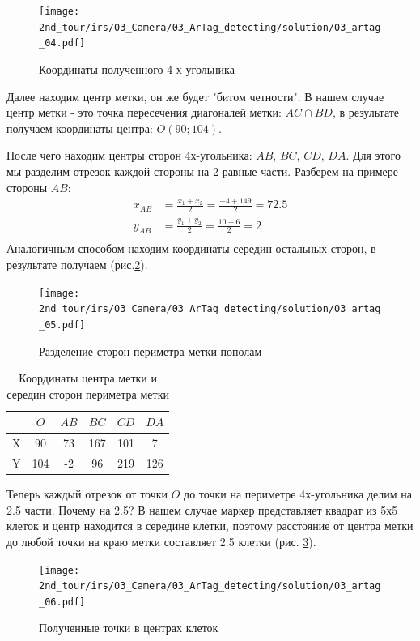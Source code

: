 \begin{figure}[H]
	\centering
	\texttt{[image: 2nd\_tour/irs/03\_Camera/03\_ArTag\_detecting/solution/03\_artag\_04.pdf]}
	\caption{Координаты полученного 4-х угольника}
	\label{fig:03_artag_04}
\end{figure}

Далее находим центр метки, он же будет "битом четности". В нашем случае центр метки - это точка пересечения диагоналей метки: $AC \cap BD$, в результате получаем координаты центра: $O(90; 104)$.

После чего находим центры сторон 4х-угольника: $AB$, $BC$, $CD$, $DA$. Для этого мы разделим отрезок каждой стороны на 2 равные части. Разберем на примере стороны $AB$:
\begin{equation*}
\begin{aligned}
x_{AB} & = \frac{x_1 + x_2}{2} = \frac{-4 + 149}{2} = 72.5 \\
y_{AB} & = \frac{y_1 + y_2}{2} = \frac{10 - 6}{2} = 2 \\		
\end{aligned}
\end{equation*}
Аналогичным способом находим координаты середин остальных сторон, в результате получаем (рис.\ref{fig:03_artag_05}).
\begin{figure}[H]
	\centering
	\texttt{[image: 2nd\_tour/irs/03\_Camera/03\_ArTag\_detecting/solution/03\_artag\_05.pdf]}
	\caption{Разделение сторон периметра метки пополам}
	\label{fig:03_artag_05}
\end{figure}

\begin{table}[H]
	\begin{center}
		\begin{tabular}{|c|c|c|c|c|c|}
			\hline 
			& $O$ & $AB$ & $BC$ & $CD$ & $DA$\\
			\hline 
			X & 90 & 73 & 167 & 101 & 7 \\ 
			\hline 
			Y & 104 & -2 & 96 & 219 & 126 \\
			\hline 
		\end{tabular} 
		\caption{Координаты центра метки и середин сторон периметра метки}
	\end{center}
\end{table}

Теперь каждый отрезок от точки $O$ до точки на периметре 4х-угольника делим на 2.5 части. Почему на 2.5? В нашем случае маркер представляет квадрат из 5х5 клеток и центр находится в середине клетки, поэтому расстояние от центра метки до любой точки на краю метки составляет 2.5 клетки (рис. \ref{fig:03_artag_06}).
\\
\begin{figure}[H]
	\centering
	\texttt{[image: 2nd\_tour/irs/03\_Camera/03\_ArTag\_detecting/solution/03\_artag\_06.pdf]}
	\caption{Полученные точки в центрах клеток}
	\label{fig:03_artag_06}
\end{figure}

